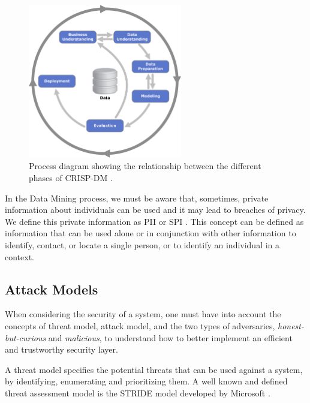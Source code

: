 \begin{figure}[!ht]
  \centering
  \includegraphics[width=0.60\textwidth]{images/CRISP-DM_Process_Diagram.png}
  \caption{Process diagram showing the relationship between the different phases of CRISP-DM \cite{wirth2000crisp}.}
  \label{fig:crisp-dm}
\end{figure}



In the Data Mining process, we must be aware that, sometimes, private information about individuals can be used and it may lead to breaches of privacy. We define this private information as \ac{PII} or \ac{SPI} \cite{schwartz2011pii}. This concept can be defined as information that can be used alone or in conjunction with other information to identify, contact, or locate a single person, or to identify an individual in a context.



\subsection{Attack Models}
\label{ssec:AttackModels}

When considering the security of a system, one must have into account the concepts of threat model, attack model, and the two types of adversaries, \textit{honest-but-curious} and \textit{malicious}, to understand how to better implement an efficient and trustworthy security layer.

A threat model specifies the potential threats that can be used against a system, by identifying, enumerating and prioritizing them. A well known and defined threat assessment model is the STRIDE model developed by Microsoft \cite{hafiz2007organizing}.

